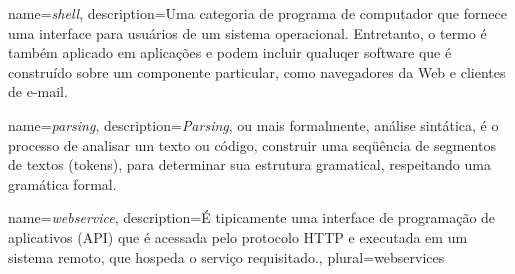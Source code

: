				{name={\emph{shell}},
				 description={Uma categoria de programa de computador que fornece uma interface para usuários de um sistema operacional. Entretanto, o termo é também aplicado em aplicações e podem incluir qualuqer software que é construído sobre um componente particular, como navegadores da Web e clientes de e-mail.}
				 }

				{name={\emph{parsing}},
				 description={\emph{Parsing}, ou mais formalmente, análise sintática, é o processo de analisar um texto ou código, construir uma seqüência de segmentos de textos (tokens), para determinar sua estrutura gramatical, respeitando uma gramática formal.}
				 }

				{name={\emph{webservice}},
				 description={É tipicamente uma interface de programação de aplicativos (API) que é acessada pelo protocolo HTTP e executada em um sistema remoto, que hospeda o serviço requisitado.},
				 plural={webservices}
				 }